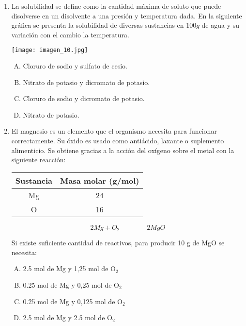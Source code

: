 \begin{enumerate}
\item La solubilidad se define como la cantidad máxima de soluto que puede disolverse en un disolvente a una presión y temperatura dada. En la siguiente gráfica se presenta la solubilidad de diversas sustancias en 100$g$ de agua y su variación con el cambio la temperatura. \label{mon-13}


\texttt{[image: imagen\_10.jpg]}
\begin{enumerate}[(A)]
\item Cloruro de sodio y sulfato de cesio.
\item Nitrato de potasio y dicromato de potasio.
\item Cloruro de sodio y dicromato de potasio.
\item Nitrato de potasio.
\end{enumerate}


\item El magnesio es un elemento que el organismo necesita para funcionar correctamente. Su óxido es usado como antiácido, laxante o suplemento alimenticio. Se obtiene gracias a la acción del oxígeno sobre el metal con la siguiente reacción: \label{mon-14}

\begin{center}
\begin{tabular}{|cc|}
\hline 
Sustancia & Masa molar (g/mol) \\
\hline 
Mg & 24\\
O & 16 \\
\hline 
\end{tabular} 
\end{center}
\begin{equation*}
2Mg + O_2   \qquad \qquad        2 MgO   
\end{equation*}

Si existe suficiente cantidad de reactivos, para producir 10 g de MgO se necesita:

\begin{enumerate}[(A)]
\item 2.5 mol de Mg y 1,25 mol de O$_2$
\item 0.25 mol de Mg y 0,25 mol de O$_2$
\item 0.25 mol de Mg y 0,125 mol de O$_2$
\item 2.5 mol de Mg y 2.5 mol de O$_2$
\end{enumerate}


\end{enumerate}
